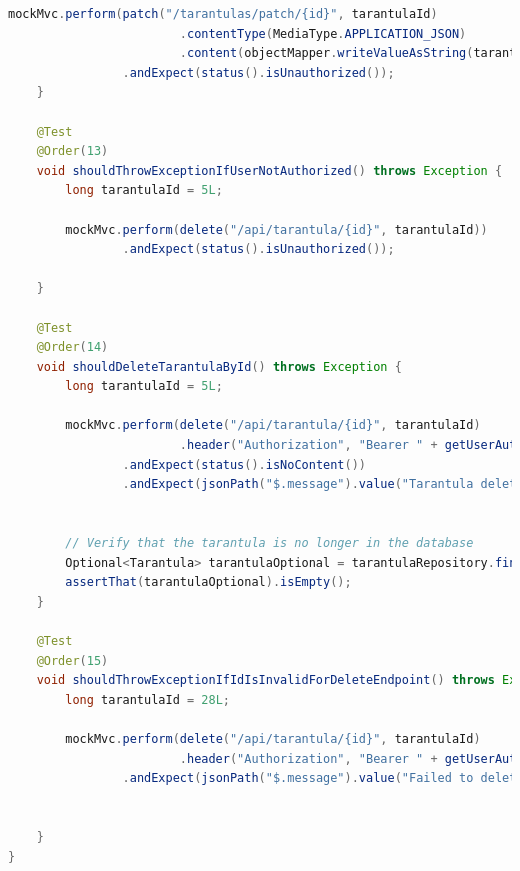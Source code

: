 \documentclass[a4paper,12pt,oneside]{article}
\begin{document}
\begin{lstlisting}[language=Java]
        mockMvc.perform(patch("/tarantulas/patch/{id}", tarantulaId)
                        .contentType(MediaType.APPLICATION_JSON)
                        .content(objectMapper.writeValueAsString(tarantulaUpdateDto)))
                .andExpect(status().isUnauthorized());
    }

    @Test
    @Order(13)
    void shouldThrowExceptionIfUserNotAuthorized() throws Exception {
        long tarantulaId = 5L;

        mockMvc.perform(delete("/api/tarantula/{id}", tarantulaId))
                .andExpect(status().isUnauthorized());

    }

    @Test
    @Order(14)
    void shouldDeleteTarantulaById() throws Exception {
        long tarantulaId = 5L;

        mockMvc.perform(delete("/api/tarantula/{id}", tarantulaId)
                        .header("Authorization", "Bearer " + getUserAuthToken()))
                .andExpect(status().isNoContent())
                .andExpect(jsonPath("$.message").value("Tarantula deleted successfully."));


        // Verify that the tarantula is no longer in the database
        Optional<Tarantula> tarantulaOptional = tarantulaRepository.findById(tarantulaId);
        assertThat(tarantulaOptional).isEmpty();
    }

    @Test
    @Order(15)
    void shouldThrowExceptionIfIdIsInvalidForDeleteEndpoint() throws Exception {
        long tarantulaId = 28L;

        mockMvc.perform(delete("/api/tarantula/{id}", tarantulaId)
                        .header("Authorization", "Bearer " + getUserAuthToken()))
                .andExpect(jsonPath("$.message").value("Failed to delete tarantula."));


    }
}
\end{lstlisting}

\newpage
\end{document}
